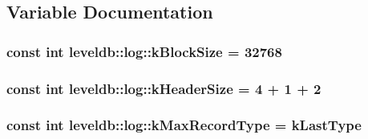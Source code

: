 \subsection{Variable Documentation}
\hypertarget{namespaceleveldb_1_1log_a2daa4274b5fc09292a7d856072f379b2}{}
\subsubsection[{k\+Block\+Size}]{\setlength{\rightskip}{0pt plus 5cm}const int leveldb\+::log\+::k\+Block\+Size = 32768\hspace{0.3cm}{\ttfamily [static]}}\label{namespaceleveldb_1_1log_a2daa4274b5fc09292a7d856072f379b2}
\hypertarget{namespaceleveldb_1_1log_a3771f9a7e5d0e9057d33fbfd371f7e83}{}
\subsubsection[{k\+Header\+Size}]{\setlength{\rightskip}{0pt plus 5cm}const int leveldb\+::log\+::k\+Header\+Size = 4 + 1 + 2\hspace{0.3cm}{\ttfamily [static]}}\label{namespaceleveldb_1_1log_a3771f9a7e5d0e9057d33fbfd371f7e83}
\hypertarget{namespaceleveldb_1_1log_a45cb8306b6156236656172086c1394df}{}
\subsubsection[{k\+Max\+Record\+Type}]{\setlength{\rightskip}{0pt plus 5cm}const int leveldb\+::log\+::k\+Max\+Record\+Type = {\bf k\+Last\+Type}\hspace{0.3cm}{\ttfamily [static]}}\label{namespaceleveldb_1_1log_a45cb8306b6156236656172086c1394df}
